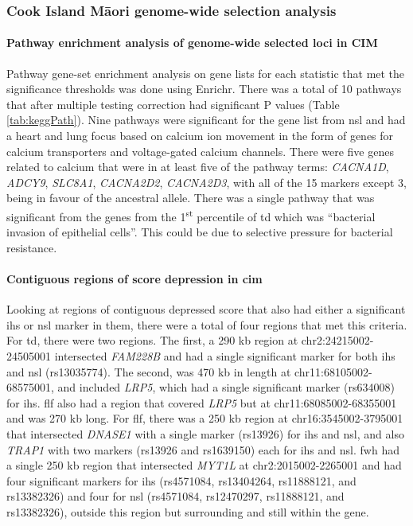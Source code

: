 \documentclass[]{report}
\let\oldparagraph\paragraph
\renewcommand{\paragraph}[1]{\oldparagraph{#1}\mbox{}}
\newcommand{\tex}[1]{#1}
\begin{document}
\FloatBarrier

\subsubsection{\texorpdfstring{Cook Island M\tex{\={a}}ori genome-wide
selection
analysis}{Cook Island Mori genome-wide selection analysis}}\label{cook-island-mori-genome-wide-selection-analysis}

\paragraph{Pathway enrichment analysis of genome-wide selected loci in
CIM}\label{cimPath}

Pathway gene-set enrichment analysis on gene lists for each statistic
that met the significance thresholds was done using Enrichr. There was a
total of 10 pathways that after multiple testing correction had
significant P values (Table \ref{tab:keggPath}). Nine pathways were
significant for the gene list from \gls{nsl} and had a heart and lung
focus based on calcium ion movement in the form of genes for calcium
transporters and voltage-gated calcium channels. There were five genes
related to calcium that were in at least five of the pathway terms:
\emph{CACNA1D}, \emph{ADCY9}, \emph{SLC8A1}, \emph{CACNA2D2},
\emph{CACNA2D3}, with all of the 15 markers except 3, being in favour of
the ancestral allele. There was a single pathway that was significant
from the genes from the 1\textsuperscript{st} percentile of \gls{td}
which was ``bacterial invasion of epithelial cells''. This could be due
to selective pressure for bacterial resistance.

\paragraph{\texorpdfstring{Contiguous regions of score depression in
\gls{cim}}{Contiguous regions of score depression in }}\label{contiguous-regions-of-score-depression-in}

Looking at regions of contiguous depressed score that also had either a
significant \gls{ihs} or \gls{nsl} marker in them, there were a total of
four regions that met this criteria. For \gls{td}, there were two
regions. The first, a 290 kb region at chr2:24215002-24505001
intersected \emph{FAM228B} and had a single significant marker for both
\gls{ihs} and \gls{nsl} (rs13035774). The second, was 470 kb in length
at chr11:68105002-68575001, and included \emph{LRP5}, which had a single
significant marker (rs634008) for \gls{ihs}. \Gls{flf} also had a region
that covered \emph{LRP5} but at chr11:68085002-68355001 and was 270 kb
long. For \gls{flf}, there was a 250 kb region at chr16:3545002-3795001
that intersected \emph{DNASE1} with a single marker (rs13926) for
\gls{ihs} and \gls{nsl}, and also \emph{TRAP1} with two markers (rs13926
and rs1639150) each for \gls{ihs} and \gls{nsl}. \Gls{fwh} had a single
250 kb region that intersected \emph{MYT1L} at chr2:2015002-2265001 and
had four significant markers for \gls{ihs} (rs4571084, rs13404264,
rs11888121, and rs13382326) and four for \gls{nsl} (rs4571084,
rs12470297, rs11888121, and rs13382326), outside this region but
surrounding and still within the gene.
\end{document}
